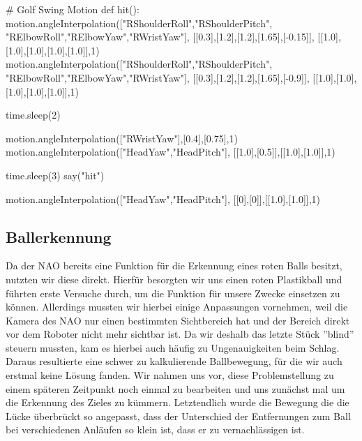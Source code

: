\documentclass{scrartcl}
\begin{document}
\begin{python}

# Golf Swing Motion
def hit():
    motion.angleInterpolation(["RShoulderRoll","RShoulderPitch",
       "RElbowRoll","RElbowYaw","RWristYaw"],
       [[0.3],[1.2],[1.2],[1.65],[-0.15]],
       [[1.0],[1.0],[1.0],[1.0],[1.0]],1)
    motion.angleInterpolation(["RShoulderRoll","RShoulderPitch",
       "RElbowRoll","RElbowYaw","RWristYaw"],
       [[0.3],[1.2],[1.2],[1.65],[-0.9]],
       [[1.0],[1.0],[1.0],[1.0],[1.0]],1)

    time.sleep(2)

    motion.angleInterpolation(["RWristYaw"],[0.4],[0.75],1)
    motion.angleInterpolation(["HeadYaw","HeadPitch"],
    	[[1.0],[0.5]],[[1.0],[1.0]],1)

    time.sleep(3)
    say("hit")

    motion.angleInterpolation(["HeadYaw","HeadPitch"],
    	[[0],[0]],[[1.0],[1.0]],1)
\end{python}

\subsection{Ballerkennung}

Da der NAO bereits eine Funktion für die Erkennung eines roten Balls besitzt, nutzten wir diese direkt. Hierfür besorgten wir uns einen roten Plastikball und führten erste Versuche durch, um die Funktion für unsere Zwecke einsetzen zu können.
Allerdings mussten wir hierbei einige Anpassungen vornehmen, weil die Kamera des NAO nur einen bestimmten Sichtbereich hat und der Bereich direkt vor dem Roboter nicht mehr sichtbar ist. Da wir deshalb das letzte Stück ''blind'' steuern mussten, kam es hierbei auch häufig zu Ungenauigkeiten beim Schlag. Daraus resultierte eine schwer zu kalkulierende Ballbewegung, für die wir auch erstmal keine Lösung fanden. Wir nahmen uns vor, diese Problemstellung zu einem späteren Zeitpunkt noch einmal zu bearbeiten und uns zunächst mal um die Erkennung des Zieles zu kümmern. Letztendlich wurde die Bewegung die die Lücke überbrückt so angepasst, dass der Unterschied der Entfernungen zum Ball bei verschiedenen Anläufen so klein ist, dass er zu vernachlässigen ist. 
\end{document}
